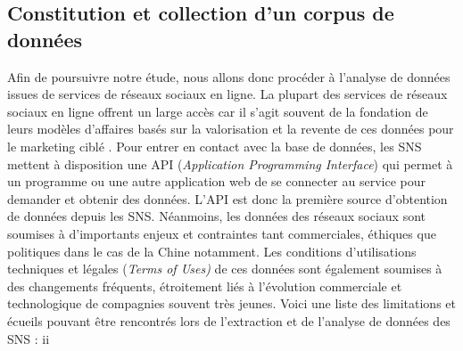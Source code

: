\subsection[Constitution et collection d{\textquoteright}un corpus de donn\'ees]{Constitution et collection d{\textquoteright}un corpus de donn\'ees}
Afin de poursuivre notre \'etude, nous allons donc proc\'eder \`a
l{\textquoteright}analyse de donn\'ees issues de services de r\'eseaux
sociaux en ligne. La plupart des services de r\'eseaux sociaux en ligne
offrent un large acc\`es car il s{\textquoteright}agit souvent de la
fondation de leurs mod\`eles d{\textquoteright}affaires bas\'es sur la
valorisation et la revente de ces donn\'ees pour le marketing cibl\'e
\cite{Ko2010}. Pour entrer en contact avec la base de donn\'ees, les SNS
mettent \`a disposition une API (\textit{Application Programming
Interface}) qui permet \`a un programme ou une autre application web de
se connecter au service pour demander et obtenir des donn\'ees.
L{\textquoteright}API est donc la premi\`ere source
d{\textquoteright}obtention de donn\'ees depuis les SNS. N\'eanmoins,
les donn\'ees des r\'eseaux sociaux sont soumises \`a
d{\textquoteright}importants enjeux et contraintes tant commerciales,
\'ethiques que politiques dans le cas de la Chine notamment. Les
conditions d{\textquoteright}utilisations techniques et l\'egales
(\textit{Terms of Uses) }de ces donn\'ees sont \'egalement soumises \`a
des changements fr\'equents, \'etroitement li\'es \`a
l{\textquoteright}\'evolution commerciale et technologique de
compagnies souvent tr\`es jeunes. Voici une liste des limitations et
\'ecueils pouvant \^etre rencontr\'es lors de
l{\textquoteright}extraction et de l{\textquoteright}analyse de
donn\'ees des SNS :
ii
